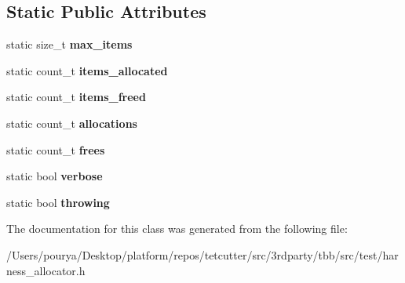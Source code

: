 \subsection*{Static Public Attributes}
\begin{DoxyCompactItemize}
\item 
\hypertarget{classstatic__counting__allocator_aab188f171a875ad8a0e698c4a79d5141}{}static size\+\_\+t {\bfseries max\+\_\+items}\label{classstatic__counting__allocator_aab188f171a875ad8a0e698c4a79d5141}

\item 
\hypertarget{classstatic__counting__allocator_a72d1dfe12a5db75a759fb2486339ca88}{}static count\+\_\+t {\bfseries items\+\_\+allocated}\label{classstatic__counting__allocator_a72d1dfe12a5db75a759fb2486339ca88}

\item 
\hypertarget{classstatic__counting__allocator_ae52d06acaf882a44fc6d9a6863aa7364}{}static count\+\_\+t {\bfseries items\+\_\+freed}\label{classstatic__counting__allocator_ae52d06acaf882a44fc6d9a6863aa7364}

\item 
\hypertarget{classstatic__counting__allocator_a522542bfc787f40159eede0c8916e8cf}{}static count\+\_\+t {\bfseries allocations}\label{classstatic__counting__allocator_a522542bfc787f40159eede0c8916e8cf}

\item 
\hypertarget{classstatic__counting__allocator_add41ed1dad885110828167f522231442}{}static count\+\_\+t {\bfseries frees}\label{classstatic__counting__allocator_add41ed1dad885110828167f522231442}

\item 
\hypertarget{classstatic__counting__allocator_a91d26318e701ef6d1c5f741ceefaf575}{}static bool {\bfseries verbose}\label{classstatic__counting__allocator_a91d26318e701ef6d1c5f741ceefaf575}

\item 
\hypertarget{classstatic__counting__allocator_ab8b8f834b83780894a6d9242a00278fd}{}static bool {\bfseries throwing}\label{classstatic__counting__allocator_ab8b8f834b83780894a6d9242a00278fd}

\end{DoxyCompactItemize}


The documentation for this class was generated from the following file\+:\begin{DoxyCompactItemize}
\item 
/\+Users/pourya/\+Desktop/platform/repos/tetcutter/src/3rdparty/tbb/src/test/harness\+\_\+allocator.\+h\end{DoxyCompactItemize}
